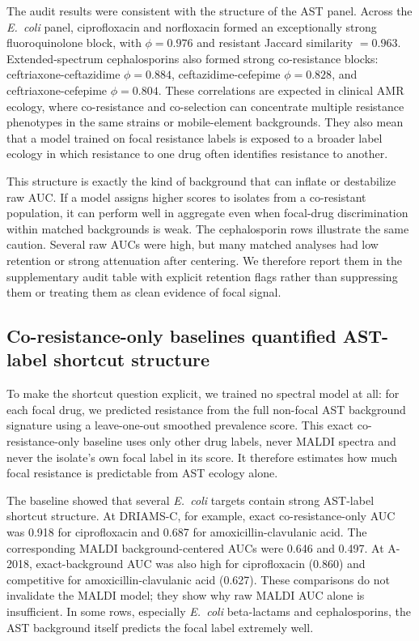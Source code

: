 \documentclass[11pt]{article}
\begin{document}
The audit results were consistent with the structure of the AST panel. Across the \textit{E.~coli} panel, ciprofloxacin and norfloxacin formed an exceptionally strong fluoroquinolone block, with $\phi = 0.976$ and resistant Jaccard similarity $= 0.963$. Extended-spectrum cephalosporins also formed strong co-resistance blocks: ceftriaxone-ceftazidime $\phi = 0.884$, ceftazidime-cefepime $\phi = 0.828$, and ceftriaxone-cefepime $\phi = 0.804$. These correlations are expected in clinical AMR ecology, where co-resistance and co-selection can concentrate multiple resistance phenotypes in the same strains or mobile-element backgrounds\cite{canton2011coresistance,pal2015coselection}. They also mean that a model trained on focal resistance labels is exposed to a broader label ecology in which resistance to one drug often identifies resistance to another.

This structure is exactly the kind of background that can inflate or destabilize raw AUC. If a model assigns higher scores to isolates from a co-resistant population, it can perform well in aggregate even when focal-drug discrimination within matched backgrounds is weak. The cephalosporin rows illustrate the same caution. Several raw AUCs were high, but many matched analyses had low retention or strong attenuation after centering. We therefore report them in the supplementary audit table with explicit retention flags rather than suppressing them or treating them as clean evidence of focal signal.

\subsection*{Co-resistance-only baselines quantified AST-label shortcut structure}

To make the shortcut question explicit, we trained no spectral model at all: for each focal drug, we predicted resistance from the full non-focal AST background signature using a leave-one-out smoothed prevalence score. This exact co-resistance-only baseline uses only other drug labels, never MALDI spectra and never the isolate's own focal label in its score. It therefore estimates how much focal resistance is predictable from AST ecology alone.

The baseline showed that several \textit{E.~coli} targets contain strong AST-label shortcut structure. At DRIAMS-C, for example, exact co-resistance-only AUC was 0.918 for ciprofloxacin and 0.687 for amoxicillin-clavulanic acid. The corresponding MALDI background-centered AUCs were 0.646 and 0.497. At A-2018, exact-background AUC was also high for ciprofloxacin (0.860) and competitive for amoxicillin-clavulanic acid (0.627). These comparisons do not invalidate the MALDI model; they show why raw MALDI AUC alone is insufficient. In some rows, especially \textit{E.~coli} beta-lactams and cephalosporins, the AST background itself predicts the focal label extremely well.
\end{document}
